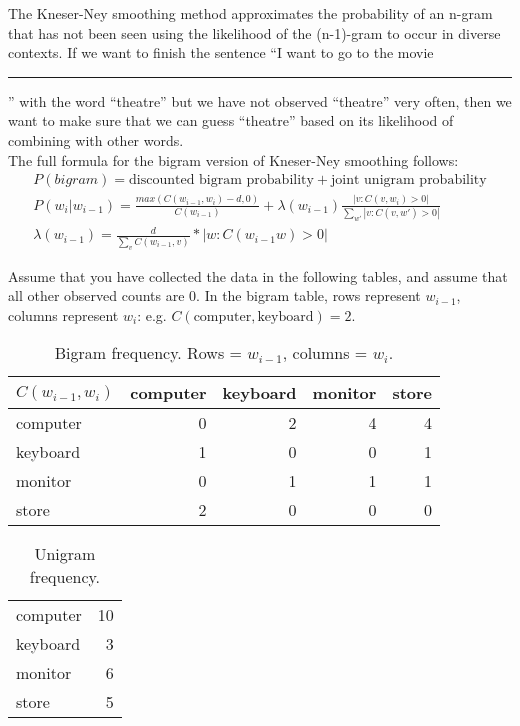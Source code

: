     The Kneser-Ney smoothing method approximates the probability of an n-gram that has not been seen using the likelihood of the (n-1)-gram to occur in diverse contexts.
    If we want to finish the sentence ``I want to go to the movie \rule{1cm}{0.15mm}'' with the word ``theatre'' but we have not observed ``theatre'' very often, then we want to make sure that we can guess ``theatre'' based on its likelihood of combining with other words. \\
    
    The full formula for the bigram version of Kneser-Ney smoothing follows:
    \begin{align}
        P(bigram) = \text{discounted bigram probability} + \text{joint unigram probability} \\
        P(w_{i} | w_{i-1}) = \frac{max(C(w_{i-1}, w_{i}) - d, 0)}{C(w_{i-1})} + \lambda(w_{i-1})\frac{|v : C(v, w_{i}) > 0|}{\sum_{w'} |v : C(v, w') > 0|} \\
        \lambda(w_{i-1}) = \frac{d}{\sum_{v}C(w_{i-1}, v)} * |w : C(w_{i-1}w) > 0 |
    \end{align}
    
    Assume that you have collected the data in the following tables, and assume that all other observed counts are 0.
    In the bigram table, rows represent $w_{i-1}$, columns represent $w_{i}$: e.g. $C(\text{computer}, \text{keyboard})=2$.
    \begin{table}[h!]
    \centering
    \begin{tabular}{l | r r r r}
    $C(w_{i-1},w_{i})$  & computer & keyboard & monitor & store \\ \hline
    computer & 0        & 2        & 4       & 4     \\
    keyboard & 1        & 0        & 0       & 1     \\
    monitor  & 0        & 1        & 1       & 1     \\
    store    & 2        & 0        & 0       & 0    
    \end{tabular}
    \caption{Bigram frequency. Rows = $w_{i-1}$, columns = $w_{i}$.}
    \label{tab:bigram_data}
    \end{table}
    \begin{table}[h!]
    \centering
    \begin{tabular}{l|r}
        computer & 10 \\
        keyboard & 3 \\
        monitor & 6 \\
        store & 5 \\
    \end{tabular}
    \caption{Unigram frequency.}
    \label{tab:unigram_data}
    \end{table}
    
